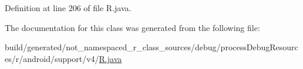 Definition at line 206 of file R.\+java.



The documentation for this class was generated from the following file\+:\begin{DoxyCompactItemize}
\item 
build/generated/not\+\_\+namespaced\+\_\+r\+\_\+class\+\_\+sources/debug/process\+Debug\+Resources/r/android/support/v4/\mbox{\hyperlink{android_2support_2v4_2_r_8java}{R.\+java}}\end{DoxyCompactItemize}

